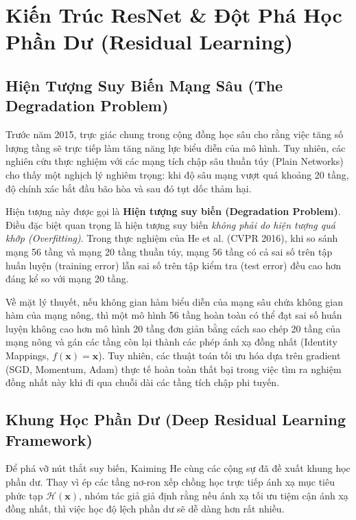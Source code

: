 \documentclass[12pt,a4paper]{report}
\begin{document}
\section{Kiến Trúc ResNet \& Đột Phá Học Phần Dư (Residual Learning)}
\label{sec:resnet}

\subsection{Hiện Tượng Suy Biến Mạng Sâu (The Degradation Problem)}
Trước năm 2015, trực giác chung trong cộng đồng học sâu cho rằng việc tăng số lượng tầng sẽ trực tiếp làm tăng năng lực biểu diễn của mô hình. Tuy nhiên, các nghiên cứu thực nghiệm với các mạng tích chập sâu thuần túy (Plain Networks) cho thấy một nghịch lý nghiêm trọng: khi độ sâu mạng vượt quá khoảng 20 tầng, độ chính xác bắt đầu bão hòa và sau đó tụt dốc thảm hại.

Hiện tượng này được gọi là \textbf{Hiện tượng suy biến (Degradation Problem)}. Điều đặc biệt quan trọng là hiện tượng suy biến \textit{không phải do hiện tượng quá khớp (Overfitting)}. Trong thực nghiệm của He et al. (CVPR 2016), khi so sánh mạng 56 tầng và mạng 20 tầng thuần túy, mạng 56 tầng có cả sai số trên tập huấn luyện (training error) lẫn sai số trên tập kiểm tra (test error) đều cao hơn đáng kể so với mạng 20 tầng.

Về mặt lý thuyết, nếu không gian hàm biểu diễn của mạng sâu chứa không gian hàm của mạng nông, thì một mô hình 56 tầng hoàn toàn có thể đạt sai số huấn luyện không cao hơn mô hình 20 tầng đơn giản bằng cách sao chép 20 tầng của mạng nông và gán các tầng còn lại thành các phép ánh xạ đồng nhất (Identity Mappings, $f(\mathbf{x}) = \mathbf{x}$). Tuy nhiên, các thuật toán tối ưu hóa dựa trên gradient (SGD, Momentum, Adam) thực tế hoàn toàn thất bại trong việc tìm ra nghiệm đồng nhất này khi đi qua chuỗi dài các tầng tích chập phi tuyến.

\subsection{Khung Học Phần Dư (Deep Residual Learning Framework)}
Để phá vỡ nút thắt suy biến, Kaiming He cùng các cộng sự đã đề xuất khung học phần dư. Thay vì ép các tầng nơ-ron xếp chồng học trực tiếp ánh xạ mục tiêu phức tạp $\mathcal{H}(\mathbf{x})$, nhóm tác giả giả định rằng nếu ánh xạ tối ưu tiệm cận ánh xạ đồng nhất, thì việc học độ lệch phần dư sẽ dễ dàng hơn rất nhiều.
\end{document}
